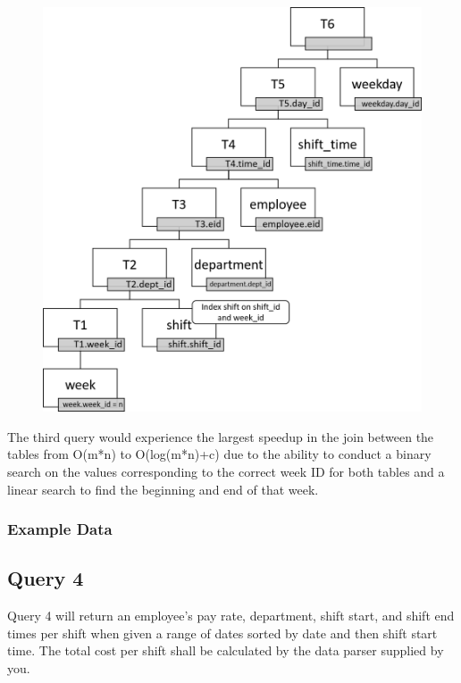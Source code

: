\documentclass[letter,12pt]{texMemo}
\begin{document}
\begin{figure}[H]
	\centering
	\includegraphics[width=.6\textwidth]{query3_indexed.png}
\end{figure}
The third query would experience the largest speedup in the join between the tables from O(m*n) to O(log(m*n)+c) due to the ability to conduct a binary search on the values corresponding to the correct week ID for both tables and a linear search to find the beginning and end of that week.
\vspace{1em}
\subsubsection*{Example Data}
\begin{changemargin}{-1.25cm}{-1.25cm}
	\begin{center}
		
	\end{center}
\end{changemargin}

\subsection*{Query 4}
Query 4 will return an employee's pay rate, department, shift start, and shift end times per shift when given a range of dates sorted by date and then shift start time. The total cost per shift shall be calculated by the data parser supplied by you.
\end{document}
